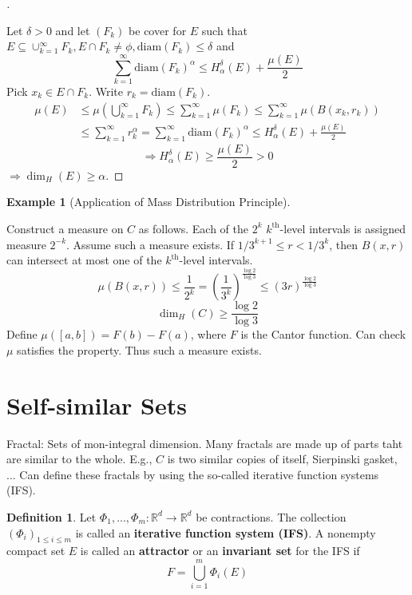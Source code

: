 \documentclass{article}
\theoremstyle{definition}
\newtheorem{ex}{Example}
\newtheorem{dfn}{Definition}
\newenvironment{proofs}[1][\proofname]{%
  \begin{proof}[#1]$ $\par\nobreak\ignorespaces
}{%
  \end{proof}
}
\newenvironment{exs}[1][]{%
  \begin{ex}[#1]$ $\par\nobreak\ignorespaces
}{%
  \end{ex}
}
\newcommand{\RR}{\mathbb R}
\newcommand{\Ra}{\Rightarrow}
\begin{document}
\begin{proofs}
	Let $\delta > 0$ and let $(F_k)$ be cover for $E$ such that $E \subseteq \cup_{k = 1}^\infty F_k, E \cap F_k \neq \phi, \text{diam}(F_k) \leq \delta$ and
	\[
		\sum_{k = 1}^\infty \text{diam}(F_k)^\alpha \leq H_\alpha^\delta(E) + \frac{\mu(E)}{2}
	\]
	Pick $x_k \in E \cap F_k$.
	Write $r_k = \text{diam}(F_k)$.
	\[
		\begin{split}
			\mu(E) & \leq \mu \left( \bigcup_{k = 1}^\infty F_k \right) \leq \sum_{k = 1}^\infty \mu(F_k) \leq \sum_{k = 1}^\infty \mu(B(x_k, r_k))\\
			&\leq \sum_{k = 1}^\infty r_k^\alpha = \sum_{k = 1}^\infty \text{diam}(F_k)^\alpha \leq H_\alpha^\delta(E) + \frac{\mu(E)}{2}
		\end{split}
	\]
	\[
		\Ra H_\alpha^\delta(E) \geq \frac{\mu(E)}{2} > 0
	\]
	$\Ra \dim_H(E) \geq \alpha$.
\end{proofs}

\begin{exs}[Application of Mass Distribution Principle]
	Construct a measure on $C$ as follows.
	Each of the $2^k$ $k^{\text{th}}$-level intervals is assigned measure $2^{-k}$.
	Assume such a measure exists.
	If $1/3^{k + 1} \leq r < 1/3^k$, then $B(x, r)$ can intersect at most one of the $k^{\text{th}}$-level intervals.
	\[
		\mu(B(x, r)) \leq \frac{1}{2^k} = \left( \frac{1}{3^k} \right)^{\frac{\log 2}{\log 3}} \leq (3r)^{\frac{\log 2}{\log 3}}
	\]
	\[
		\dim_H(C) \geq \frac{\log 2}{\log 3}
	\]
	Define $\mu([a, b]) = F(b) - F(a)$, where $F$ is the Cantor function.
	Can check $\mu$ satisfies the property.
	Thus such a measure exists.
\end{exs}

\section{Self-similar Sets}

Fractal: Sets of mon-integral dimension.
Many fractals are made up of parts taht are similar to the whole.
E.g., $C$ is two similar copies of itself, Sierpinski gasket, ...
Can define these fractals by using the so-called iterative function systems (IFS).

\begin{dfn}
	Let $\Phi_1, ..., \Phi_m: \RR^d \to \RR^d$ be contractions.
	The collection $(\Phi_i)_{1 \leq i \leq m}$ is called an \textbf{iterative function system (IFS)}.
	A nonempty compact set $E$ is called an \textbf{attractor} or an \textbf{invariant set} for the IFS if
	\[
		F = \bigcup_{i =1}^m \Phi_i(E)
	\]
\end{dfn}
\end{document}

